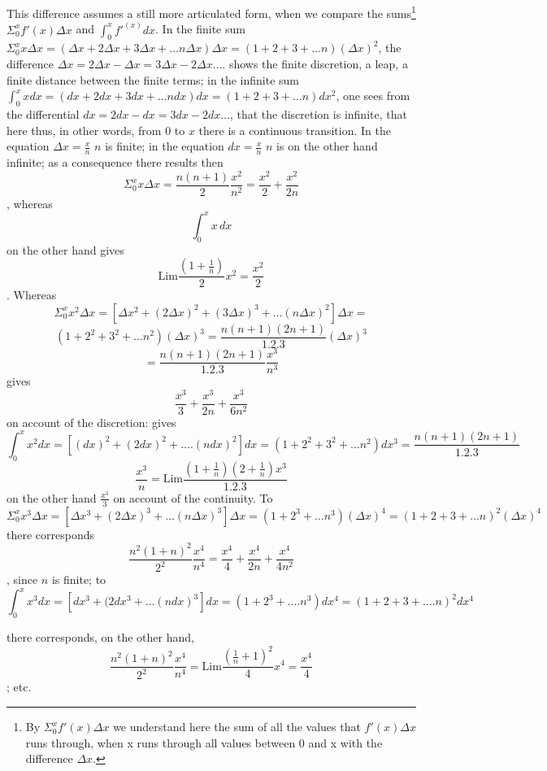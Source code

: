 \documentclass[12pt,a4paper,openany]{book}
\newcommand{\opage}[1]{\marginnote{\footnotesize\textit{[#1]}}}
\begin{document}
This difference assumes a still more articulated form,
when we compare the sums\footnote[1]{By $\Sigma_{0}^{x}f'(x)\Delta x$ we understand here the sum of all the values that $f'(x)\Delta x$ runs through, when x runs through all values between 0 and x with the difference $\Delta x$.} $\Sigma_{0}^{x}f'(x)\Delta x$ and $\int_{0}^{x}f'^{(x)}dx$.
\setcounter{footnote}{0}%
\opage{103}In the finite sum $\Sigma_{0}^{x}x\Delta x=(\Delta x+2\Delta x+3\Delta x+\ldots n\Delta x)\Delta x=(1+2+3+\ldots n)(\Delta x)^{2}$, the difference $\Delta x=2\Delta x-\Delta x=3\Delta x-2\Delta x\ldots.$ shows the finite discretion,
a leap, a finite distance between the finite
terms; in the infinite sum $\int_{0}^{x}xdx=(dx+2dx+3dx+\ldots ndx)dx=(1+2+3+\ldots n)dx^{2}$, one sees from the differential $dx=2dx-dx=3dx-2dx\ldots$, that the discretion
is infinite, that here thus, in other words, from $0$ to $x$ there is a
continuous transition. In the equation $\Delta x=\frac{x}{n}$ $n$ is finite; in the equation $dx=\frac{x}{n}$ $n$ is on the other hand infinite; as a consequence
there results then
\[ \Sigma_{0}^{x}x\Delta x=\frac{n(n+1)}{2}\frac{x^{2}}{n^{2}}=\frac{x^{2}}{2}+\frac{x^{2}}{2n} \]
, whereas
\[ \int_{0}^{x}x\,dx \]
on the other hand gives
\[ \mathrm{Lim}\frac{(1+\frac{1}{n})}{2}x^{2}=\frac{x^{2}}{2} \]
. Whereas
\[ \Sigma_{0}^{x}x^{2}\Delta x=[\Delta x^{2}+(2\Delta x)^{2}+(3\Delta x)^{3}+\ldots(n\Delta x)^{2}]\Delta x= \] %
\[ (1+2^{2}+3^{2}+\ldots n^{2})(\Delta x)^{3}=\frac{n(n+1)(2n+1)}{1.2.3}(\Delta x)^{3} \]
\[ =\frac{n(n+1)(2n+1)}{1.2.3}\frac{x^{3}}{n^{3}} \]
gives
\[ \frac{x^{3}}{3}+\frac{x^{3}}{2n}+\frac{x^{3}}{6n^{2}} \]
on account
of the discretion: gives
\[ \int_{0}^{x}x^{2}dx=[(dx)^{2}+(2dx)^{2}+\ldots.(ndx)^{2}]dx=(1+2^{2}+3^{2}+\ldots n^{2})dx^{3}=\frac{n(n+1)(2n+1)}{1.2.3} \]
\[ \frac{x^{3}}{n}=\mathrm{Lim}\frac{(1+\frac{1}{n})(2+\frac{1}{n})x^{3}}{1.2.3} \] %
on the other hand $\frac{x^{3}}{3}$ on account of
the continuity. To
\[ \Sigma_{0}^{x}x^{3}\Delta x=[\Delta x^{3}+(2\Delta x)^{3}+\ldots(n\Delta x)^{3}]\Delta x=(1+2^{3}+\ldots n^{3})(\Delta x)^{4}=(1+2+3+\ldots n)^{2}(\Delta x)^{4} \]
there corresponds
\[ \frac{n^{2}(1+n)^{2}}{2^{2}}\frac{x^{4}}{n^{4}}=\frac{x^{4}}{4}+\frac{x^{4}}{2n}+\frac{x^{4}}{4n^{2}} \]
, since $n$ is
\setcounter{footnote}{0}%
\opage{104}finite; to
\[ \int_{0}^{x}x^{3}dx=[dx^{3}+(2dx^{3}+\ldots(ndx)^{3}]dx=(1+2^{3}+\ldots.n^{3})dx^{4}=(1+2+3+\ldots.n)^{2}dx^{4} \]

there corresponds, on the other hand,
\[ \frac{n^{2}(1+n)^{2}}{2^{2}}\frac{x^{4}}{n^{4}}=\mathrm{Lim}\frac{(\frac{1}{n}+1)^{2}}{4}x^{4}=\frac{x^{4}}{4} \]
; etc.
\end{document}
